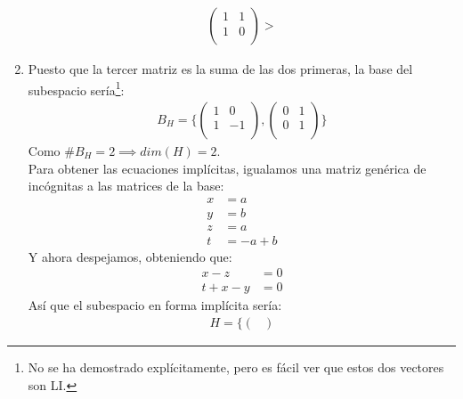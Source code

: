 \documentclass{article}
\begin{document}
\begin{enumerate}[label = (\alph*)]
\begin{equation}
\begin{split}
\begin{pmatrix}
                1 & 1 \\
                1 & 0 \\
                \end{pmatrix}>
        \end{split}
    \end{equation}
    \item
    Puesto que la tercer matriz es la suma de las dos primeras, la base del subespacio sería\footnote{No se ha demostrado
    explícitamente, pero es fácil ver que estos dos vectores son LI.}:
    \begin{equation}
        \begin{split}
            B_{H} = \{ \begin{pmatrix}
                1 & 0 \\
                1 & -1 \\
                \end{pmatrix},\begin{pmatrix}
                0 & 1 \\
                0 & 1 \\
                \end{pmatrix} \}
        \end{split}
    \end{equation}
    Como $\# B_{H} = 2 \implies dim(H) = 2$.\\
    Para obtener las ecuaciones implícitas, igualamos una matriz genérica de incógnitas a las matrices de la base:
    \begin{equation}
        \begin{split}
            x &= a\\
            y &= b\\
            z &= a\\
            t &= -a+b
        \end{split}
    \end{equation}
    Y ahora despejamos, obteniendo que:
    \begin{equation}
        \begin{split}
            x - z &= 0\\
            t+x-y &= 0
        \end{split}
    \end{equation}
    Así que el subespacio en forma implícita sería:
    \begin{equation}
        \begin{split}
            H = \{ \begin{pmatrix}

\end{pmatrix}
\end{split}
\end{equation}
\end{enumerate}
\end{document}
